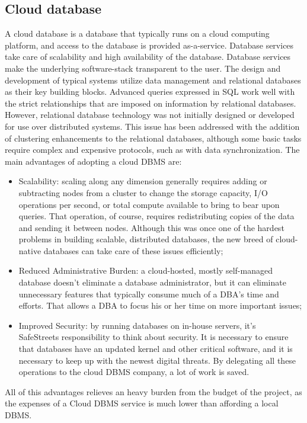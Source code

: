 \subsection{Cloud database}
A cloud database is a database that typically runs on a cloud computing platform, and access to the database is provided as-a-service.
Database services take care of scalability and high availability of the database. Database services make the underlying software-stack transparent to the user.
The design and development of typical systems utilize data management and relational databases as their key building blocks. Advanced queries expressed in SQL work well with the strict relationships that are imposed on information by relational databases. However, relational database technology was not initially designed or developed for use over distributed systems. This issue has been addressed with the addition of clustering enhancements to the relational databases, although some basic tasks require complex and expensive protocols, such as with data synchronization.
\newline The main advantages of adopting a cloud DBMS are:
\begin{itemize}
    \item Scalability: scaling along any dimension generally requires adding or subtracting nodes from a cluster to change the storage capacity, I/O operations per second, or total compute available to bring to bear upon queries. That operation, of course, requires redistributing copies of the data and sending it between nodes. Although this was once one of the hardest problems in building scalable, distributed databases, the new breed of cloud-native databases can take care of these issues efficiently;
    \item Reduced Administrative Burden: a cloud-hosted, mostly self-managed data\-base doesn’t eliminate a database administrator, but it can eliminate unnecessary features that typically consume much of a DBA’s time and efforts. That allows a DBA to focus his or her time on more important issues;
    \item Improved Security: by running databases on in-house servers, it’s \\ SafeStreets responsibility to think about security. It is necessary to ensure that data\-bases have an updated kernel and other critical software, and it is necessary to keep up with the newest digital threats. By delegating all these operations to the cloud DBMS company, a lot of work is saved.
\end{itemize}
All of this advantages relieves an heavy burden from the budget of the project, as the expenses of a Cloud DBMS service is much lower than affording a local DBMS.
